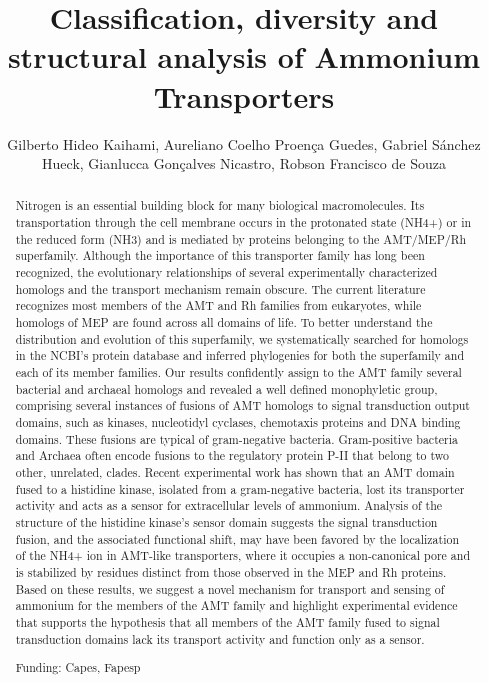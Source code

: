 \documentclass[twoside]{article}
\title{\vspace{-15mm}\fontsize{24pt}{10pt}\selectfont\textbf{ Classification,  diversity and structural analysis of Ammonium Transporters }} %
\author{ Gilberto Hideo Kaihami, Aureliano Coelho Proen\c{c}a Guedes, Gabriel S\'anchez Hueck, Gianlucca Gon\c{c}alves Nicastro, Robson Francisco de Souza }
\affil{  }
\date{}
\begin{document}
  
  
  \maketitle %
  
  
  \thispagestyle{fancy} %
  
  
  \begin{abstract}
  Nitrogen is an essential building block for many biological macromolecules. Its transportation through the cell membrane occurs in the protonated state (NH4+) or in the reduced form (NH3) and is mediated by proteins belonging to the AMT/MEP/Rh superfamily. Although the importance of this transporter family has long been recognized,  the evolutionary relationships of several experimentally characterized homologs and the transport mechanism remain obscure. The current literature recognizes most members of the AMT and Rh families from eukaryotes,  while homologs of MEP are found across all domains of life. To better understand the distribution and evolution of this superfamily,  we systematically searched for homologs in the NCBI’s protein database and inferred phylogenies for both the superfamily and each of its member families. Our results confidently assign to the AMT family several bacterial and archaeal homologs and revealed a well defined monophyletic group,  comprising several instances of fusions of AMT homologs to signal transduction output domains,  such as kinases,  nucleotidyl cyclases,  chemotaxis proteins and DNA binding domains. These fusions are typical of gram-negative bacteria. Gram-positive bacteria and Archaea often encode fusions to the regulatory protein P-II that belong to two other,  unrelated,  clades. Recent experimental work has shown that an AMT domain fused to a histidine kinase,  isolated from a gram-negative bacteria,  lost its transporter activity and acts as a sensor for extracellular levels of ammonium. Analysis of the structure of the histidine kinase’s sensor domain suggests the signal transduction fusion,  and the associated functional shift,  may have been favored by the localization of the NH4+ ion in AMT-like transporters,  where it occupies a non-canonical pore and is stabilized by residues distinct from those observed in the MEP and Rh proteins. Based on these results,  we suggest a novel mechanism for transport and sensing of ammonium for the members of the AMT family and highlight experimental evidence that supports the hypothesis that all members of the AMT family fused to signal transduction domains lack its transport activity and function only as a sensor.
  
  Funding: Capes,  Fapesp \\ 
  \end{abstract}
  
\end{document}
